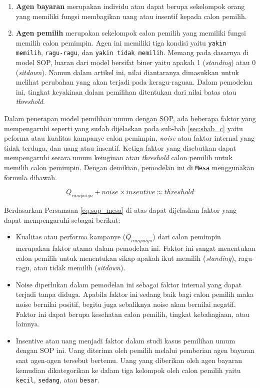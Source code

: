 \begin{enumerate}
\item \textbf{Agen bayaran} merupakan individu atau dapat berupa sekelompok orang yang memiliki fungsi membagikan uang atau insentif kepada calon pemilih.

\item \textbf{Agen pemilih} merupakan sekelompok calon pemilih yang memiliki fungsi memilih calon pemimpin. Agen ini memiliki tiga kondisi yaitu \texttt{yakin memilih}, \texttt{ragu-ragu}, dan \texttt{yakin tidak memilih}. Memang pada dasarnya di model SOP, luaran dari model bersifat biner yaitu apakah 1 (\textit{standing}) atau 0 (\textit{sitdown}). Namun dalam artikel ini, nilai diantaranya dimasukkan untuk melihat perubahan yang akan terjadi pada keragu-raguan. Dalam pemodelan ini, tingkat keyakinan dalam pemilihan ditentukan dari nilai batas atau \textit{threshold}.
\end{enumerate}

Dalam penerapan model pemilihan umum dengan SOP, ada beberapa faktor yang mempengaruhi seperti yang sudah dijelaskan pada sub-bab \ref{sec:sbab_c} yaitu peforma atau kualitas kampanye calon pemimpin, \textit{noise} atau faktor internal yang tidak terduga, dan uang atau insentif. Ketiga faktor yang disebutkan dapat mempengaruhi secara umum keinginan atau \textit{threshold} calon pemilih untuk memilih calon pemimpin. Dengan demikian, pemodelan ini di \texttt{Mesa} menggunakan formula dibawah.

\begin{equation}
Q_{campaign} + noise \times insentive \approx threshold
\label{eq:sop_mesa}
\end{equation}

Berdasarkan Persamaan \ref{eq:sop_mesa} di atas dapat dijelaskan faktor yang dapat mempengaruhi sebagai berikut:

\begin{itemize}
\item Kualitas atau performa kampanye ($Q_{campaign}$) dari calon pemimpin merupakan faktor utama dalam pemodelan ini. Faktor ini sangat menentukan calon pemilih untuk menentukan sikap apakah ikut memilih (\textit{standing}), ragu-ragu, atau tidak memilih (\textit{sitdown}).

\item Noise diperlukan dalam pemodelan ini sebagai faktor internal yang dapat terjadi tanpa diduga. Apabila faktor ini sedang baik bagi calon pemilih maka noise bernilai positif, begitu juga sebaliknya noise akan bernilai negatif. Faktor ini dapat berupa kesehatan calon pemilih, tingkat kebahagiaan, atau lainnya.

\item Insentive atau uang menjadi faktor dalam studi kasus pemilihan umum dengan SOP ini. Uang diterima oleh pemilih melalui pemberian agen bayaran saat agen-agen tersebut bertemu. Uang yang diberikan oleh agen bayaran kemudian dikategorikan ke dalam tiga kelompok oleh calon pemilih yaitu \texttt{kecil}, \texttt{sedang}, atau \texttt{besar}.
\end{itemize}

